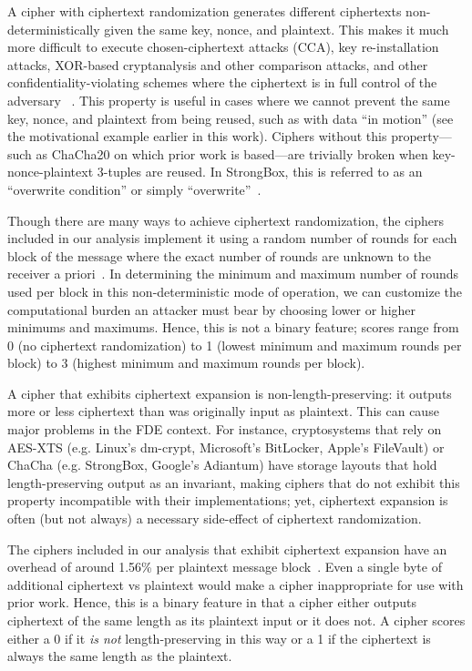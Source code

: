 
 A cipher with ciphertext
randomization generates different ciphertexts non-deterministically given the
same key, nonce, and plaintext. This makes it much more difficult to execute
chosen-ciphertext attacks (CCA), key re-installation attacks, XOR-based
cryptanalysis and other comparison attacks, and other confidentiality-violating
schemes where the ciphertext is in full control of the adversary
~\cite{Freestyle}. This property is useful in cases where we cannot prevent the
same key, nonce, and plaintext from being reused, such as with data ``in
motion'' (see the motivational example earlier in this work). Ciphers without
this property---such as ChaCha20 on which prior work is based---are trivially
broken when key-nonce-plaintext 3-tuples are reused. In StrongBox, this is
referred to as an ``overwrite condition'' or simply
``overwrite''~\cite{StrongBox}.

Though there are many ways to achieve ciphertext randomization, the ciphers
included in our analysis implement it using a random number of rounds for each
block of the message where the exact number of rounds are unknown to the
receiver a priori~\cite{Freestyle}. In determining the minimum and maximum
number of rounds used per block in this non-deterministic mode of operation, we
can customize the computational burden an attacker must bear by choosing lower
or higher minimums and maximums. Hence, this is not a binary feature; scores
range from 0 (no ciphertext randomization) to 1 (lowest minimum and maximum
rounds per block) to 3 (highest minimum and maximum rounds per block).


 A cipher that exhibits ciphertext
expansion is non-length-preserving: it outputs more or less ciphertext than was
originally input as plaintext. This can cause major problems in the FDE context.
For instance, cryptosystems that rely on AES-XTS (e.g. Linux's dm-crypt,
Microsoft's BitLocker, Apple's FileVault) or ChaCha (e.g. StrongBox, Google's
Adiantum) have storage layouts that hold length-preserving output as an
invariant, making ciphers that do not exhibit this property incompatible with
their implementations; yet, ciphertext expansion is often (but not always) a
necessary side-effect of ciphertext randomization.

The ciphers included in our analysis that exhibit ciphertext expansion have an
overhead of around 1.56\% per plaintext message block~\cite{Freestyle}. Even a
single byte of additional ciphertext vs plaintext would make a cipher
inappropriate for use with prior work. Hence, this is a binary feature in that a
cipher either outputs ciphertext of the same length as its plaintext input or it
does not. A cipher scores either a 0 if it \emph{is not} length-preserving in
this way or a 1 if the ciphertext is always the same length as the plaintext.


